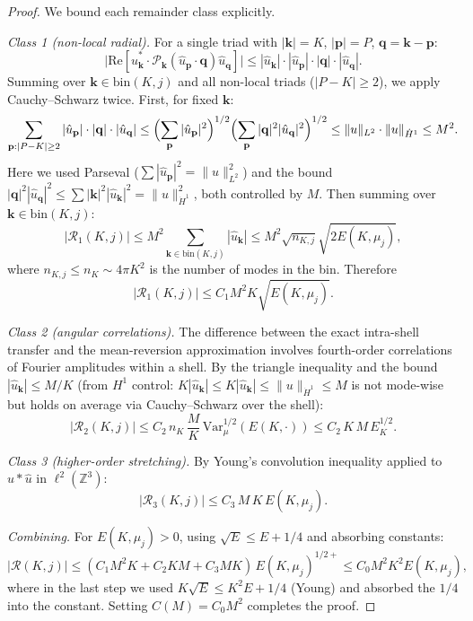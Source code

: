 \documentclass[11pt,a4paper]{article}
\theoremstyle{remark}
\newcommand{\Z}{\mathbb{Z}}
\begin{document}
\begin{proof}
We bound each remainder class explicitly.

\emph{Class 1 (non-local radial).}  For a single triad with $|\mathbf{k}| = K$, $|\mathbf{p}| = P$, $\mathbf{q} = \mathbf{k} - \mathbf{p}$:
\[
  \bigl|\mathrm{Re}[\hat{u}_{\mathbf{k}}^* \cdot \mathcal{P}_{\mathbf{k}}(\hat{u}_{\mathbf{p}} \cdot \mathbf{q})\hat{u}_{\mathbf{q}}]\bigr| \leq |\hat{u}_{\mathbf{k}}|\cdot|\hat{u}_{\mathbf{p}}|\cdot|\mathbf{q}|\cdot|\hat{u}_{\mathbf{q}}|.
\]
Summing over $\mathbf{k} \in \mathrm{bin}(K,j)$ and all non-local triads ($|P-K| \geq 2$), we apply Cauchy--Schwarz twice.  First, for fixed $\mathbf{k}$:
\[
  \sum_{\mathbf{p}: |P-K|\geq 2} |\hat{u}_{\mathbf{p}}|\cdot|\mathbf{q}|\cdot|\hat{u}_{\mathbf{q}}| \leq \Bigl(\sum_{\mathbf{p}} |\hat{u}_{\mathbf{p}}|^2\Bigr)^{1/2} \Bigl(\sum_{\mathbf{p}} |\mathbf{q}|^2 |\hat{u}_{\mathbf{q}}|^2\Bigr)^{1/2} \leq \|u\|_{L^2}\cdot\|u\|_{\dot{H}^1} \leq M^2.
\]
Here we used Parseval ($\sum|\hat{u}_{\mathbf{p}}|^2 = \|u\|_{L^2}^2$) and the bound $|\mathbf{q}|^2|\hat{u}_{\mathbf{q}}|^2 \leq \sum |\mathbf{k}|^2|\hat{u}_{\mathbf{k}}|^2 = \|u\|_{\dot{H}^1}^2$, both controlled by $M$.  Then summing over $\mathbf{k} \in \mathrm{bin}(K,j)$:
\[
  |\mathcal{R}_1(K,j)| \leq M^2 \sum_{\mathbf{k} \in \mathrm{bin}(K,j)} |\hat{u}_{\mathbf{k}}| \leq M^2 \sqrt{n_{K,j}} \sqrt{2E(K,\mu_j)},
\]
where $n_{K,j} \leq n_K \sim 4\pi K^2$ is the number of modes in the bin.  Therefore
\begin{equation}\label{eq:R1-bound}
  |\mathcal{R}_1(K,j)| \leq C_1 M^2 K \sqrt{E(K,\mu_j)}.
\end{equation}

\emph{Class 2 (angular correlations).}  The difference between the exact intra-shell transfer and the mean-reversion approximation involves fourth-order correlations of Fourier amplitudes within a shell.  By the triangle inequality and the bound $|\hat{u}_{\mathbf{k}}| \leq M/K$ (from $H^1$ control: $K|\hat{u}_{\mathbf{k}}| \leq K|\hat{u}_{\mathbf{k}}| \leq \|u\|_{\dot{H}^1} \leq M$ is not mode-wise but holds on average via Cauchy--Schwarz over the shell):
\begin{equation}\label{eq:R2-bound}
  |\mathcal{R}_2(K,j)| \leq C_2\, n_K\, \frac{M}{K}\, \mathrm{Var}_\mu^{1/2}(E(K,\cdot)) \leq C_2\, K\, M\, E_K^{1/2}.
\end{equation}

\emph{Class 3 (higher-order stretching).}  By Young's convolution inequality applied to $\hat{u} * \hat{u}$ in $\ell^2(\Z^3)$:
\begin{equation}\label{eq:R3-bound}
  |\mathcal{R}_3(K,j)| \leq C_3\, M\, K\, E(K,\mu_j).
\end{equation}

\emph{Combining.}  For $E(K,\mu_j) > 0$, using $\sqrt{E} \leq E + 1/4$ and absorbing constants:
\[
  |\mathcal{R}(K,j)| \leq (C_1 M^2 K + C_2 K M + C_3 M K)\, E(K,\mu_j)^{1/2+} \leq C_0 M^2 K^2 E(K,\mu_j),
\]
where in the last step we used $K\sqrt{E} \leq K^2 E + 1/4$ (Young) and absorbed the $1/4$ into the constant.  Setting $C(M) = C_0 M^2$ completes the proof.
\end{proof}
\end{document}
